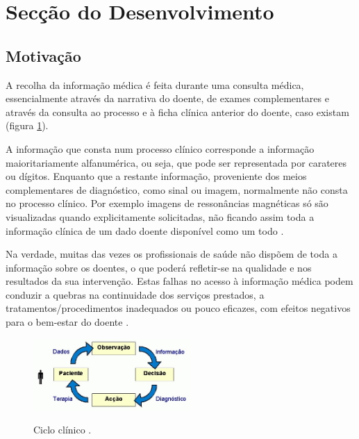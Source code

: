 \documentclass[conference]{IEEEtran}
\begin{document}
\section{Secção do Desenvolvimento}

\subsection{Motivação}

A recolha da informação médica é feita durante uma consulta médica, essencialmente através da narrativa do doente, de exames complementares e através da consulta ao processo e à ficha clínica anterior do doente, caso existam (figura \ref{fig1}).

A informação que consta num processo clínico corresponde a informação maioritariamente alfanumérica, ou seja, que pode ser representada por carateres ou dígitos. Enquanto que a restante informação, proveniente dos meios complementares de diagnóstico, como sinal ou imagem, normalmente não consta no processo clínico. Por exemplo imagens de ressonâncias magnéticas só são visualizadas quando explicitamente solicitadas, não ficando assim toda a informação clínica de um dado doente disponível como um todo \cite{santos2010comunicaccao}.

Na verdade, muitas das vezes os profissionais de saúde não dispõem de toda a informação sobre os doentes, o que poderá refletir-se na qualidade e nos resultados da sua intervenção. Estas falhas no acesso à informação médica podem conduzir a quebras na continuidade dos serviços prestados, a tratamentos/procedimentos inadequados ou pouco eficazes, com efeitos negativos para o bem-estar do doente \cite{santos2010comunicaccao}. 

\begin{figure}[!ht]
    \centering
    \begin{minipage}{.9\textwidth}
        \includegraphics[width=0.53\textwidth]{diagnostico_terapeutica.png}
        \label{fig1}
    \end{minipage}%
    \caption{Ciclo clínico \cite{regclinelect}.}
\end{figure}
 
\end{document}
